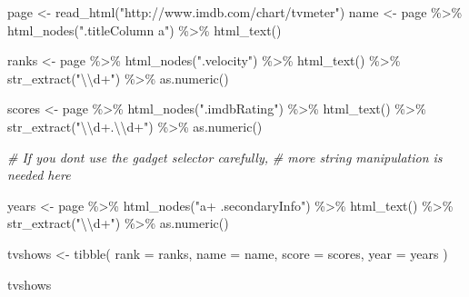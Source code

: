 \documentclass[
]{book}
\newenvironment{Shaded}{\begin{snugshade}}{\end{snugshade}}
\newcommand{\AttributeTok}[1]{\textcolor[rgb]{0.77,0.63,0.00}{#1}}
\newcommand{\CommentTok}[1]{\textcolor[rgb]{0.56,0.35,0.01}{\textit{#1}}}
\newcommand{\FunctionTok}[1]{\textcolor[rgb]{0.00,0.00,0.00}{#1}}
\newcommand{\NormalTok}[1]{#1}
\newcommand{\OtherTok}[1]{\textcolor[rgb]{0.56,0.35,0.01}{#1}}
\newcommand{\SpecialCharTok}[1]{\textcolor[rgb]{0.00,0.00,0.00}{#1}}
\newcommand{\StringTok}[1]{\textcolor[rgb]{0.31,0.60,0.02}{#1}}
\begin{document}
\begin{Shaded}
\begin{Highlighting}[]
\NormalTok{page }\OtherTok{\textless{}{-}} \FunctionTok{read\_html}\NormalTok{(}\StringTok{"http://www.imdb.com/chart/tvmeter"}\NormalTok{)}
\NormalTok{name }\OtherTok{\textless{}{-}}\NormalTok{ page }\SpecialCharTok{\%\textgreater{}\%}
  \FunctionTok{html\_nodes}\NormalTok{(}\StringTok{".titleColumn a"}\NormalTok{) }\SpecialCharTok{\%\textgreater{}\%}
  \FunctionTok{html\_text}\NormalTok{()}

\NormalTok{ranks }\OtherTok{\textless{}{-}}\NormalTok{ page }\SpecialCharTok{\%\textgreater{}\%}
  \FunctionTok{html\_nodes}\NormalTok{(}\StringTok{".velocity"}\NormalTok{) }\SpecialCharTok{\%\textgreater{}\%}
  \FunctionTok{html\_text}\NormalTok{() }\SpecialCharTok{\%\textgreater{}\%}
  \FunctionTok{str\_extract}\NormalTok{(}\StringTok{"}\SpecialCharTok{\textbackslash{}\textbackslash{}}\StringTok{d+"}\NormalTok{) }\SpecialCharTok{\%\textgreater{}\%}
  \FunctionTok{as.numeric}\NormalTok{()}

\NormalTok{scores }\OtherTok{\textless{}{-}}\NormalTok{  page }\SpecialCharTok{\%\textgreater{}\%}
  \FunctionTok{html\_nodes}\NormalTok{(}\StringTok{".imdbRating"}\NormalTok{) }\SpecialCharTok{\%\textgreater{}\%}
  \FunctionTok{html\_text}\NormalTok{() }\SpecialCharTok{\%\textgreater{}\%}
  \FunctionTok{str\_extract}\NormalTok{(}\StringTok{"}\SpecialCharTok{\textbackslash{}\textbackslash{}}\StringTok{d+.}\SpecialCharTok{\textbackslash{}\textbackslash{}}\StringTok{d+"}\NormalTok{) }\SpecialCharTok{\%\textgreater{}\%}
  \FunctionTok{as.numeric}\NormalTok{()}

\CommentTok{\# If you don\textquotesingle{}t use the gadget selector carefully, }
\CommentTok{\# more string manipulation is needed here}

\NormalTok{years }\OtherTok{\textless{}{-}}\NormalTok{ page }\SpecialCharTok{\%\textgreater{}\%}
  \FunctionTok{html\_nodes}\NormalTok{(}\StringTok{"a+ .secondaryInfo"}\NormalTok{) }\SpecialCharTok{\%\textgreater{}\%}
  \FunctionTok{html\_text}\NormalTok{() }\SpecialCharTok{\%\textgreater{}\%}
  \FunctionTok{str\_extract}\NormalTok{(}\StringTok{"}\SpecialCharTok{\textbackslash{}\textbackslash{}}\StringTok{d+"}\NormalTok{) }\SpecialCharTok{\%\textgreater{}\%}
  \FunctionTok{as.numeric}\NormalTok{()}
\end{Highlighting}
\end{Shaded}

\begin{Shaded}
\begin{Highlighting}[]
\NormalTok{tvshows }\OtherTok{\textless{}{-}} \FunctionTok{tibble}\NormalTok{(}
  \AttributeTok{rank =}\NormalTok{ ranks,}
  \AttributeTok{name =}\NormalTok{ name,}
  \AttributeTok{score =}\NormalTok{ scores,}
  \AttributeTok{year =}\NormalTok{ years}
\NormalTok{)}

\NormalTok{tvshows}
\end{Highlighting}
\end{Shaded}
\end{document}
